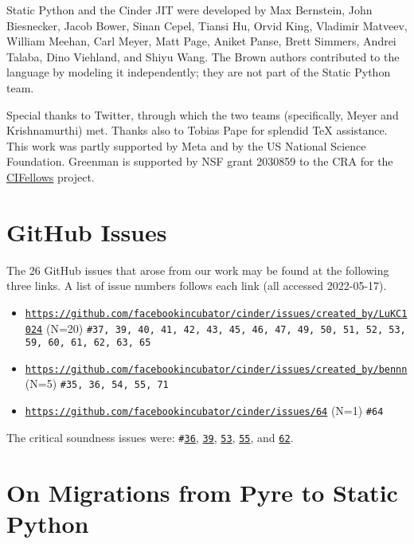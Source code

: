 \documentclass[english,cleveref,crc]{programming}
\newcommand{\shorturl}[2]{\href{#1#2}{\texttt{#1#2}}}
\newcommand{\SP}{Static Python}
\newcommand{\code}[1]{\texttt{#1}}
\begin{document}
\acks
  \SP{} and the Cinder JIT were developed by
  Max Bernstein,
  John Biesnecker,
  Jacob Bower,
  Sinan Cepel,
  Tiansi Hu,
  Orvid King,
  Vladimir Matveev,
  William Meehan,
  Carl Meyer,
  Matt Page,
  Aniket Panse,
  Brett Simmers,
  Andrei Talaba,
  Dino Viehland,
  and Shiyu Wang.
  The Brown authors contributed to the language by modeling it independently; they
  are not part of the \SP{} team.

  Special thanks to Twitter, through which the two teams
  (specifically, Meyer and Krishnamurthi) met.
  Thanks also to Tobias Pape for splendid \TeX{} assistance.
  This work was partly supported by Meta and by the US National Science Foundation.
  Greenman is supported by NSF grant 2030859 to the CRA for the \href{https://cifellows2020.org}{CIFellows} project.

\clearpage
\appendix

\section{GitHub Issues}
\label{a:github-issues}

The 26 GitHub issues that arose from our work may be found at the following three links.
A list of issue numbers follows each link (all accessed 2022-05-17).

\begin{itemize}
  \item \shorturl{https://}{github.com/facebookincubator/cinder/issues/created\_by/LuKC1024} (N=20)
    \subitem \code{\#37, 39, 40, 41, 42, 43, 45, 46, 47, 49, 50, 51, 52, 53, 59, 60, 61, 62, 63, 65}
  \item \shorturl{https://}{github.com/facebookincubator/cinder/issues/created\_by/bennn} (N=5)
    \subitem \code{\#35, 36, 54, 55, 71}
  \item \shorturl{https://}{github.com/facebookincubator/cinder/issues/64} (N=1)
    \subitem \code{\#64}
\end{itemize}

{
  \newcommand{\spsoundness}[1]{\href{https://github.com/facebookincubator/cinder/issues/#1}{\code{#1}}}
\noindent{}The critical soundness issues were:
\code{\#}\spsoundness{36},
         \spsoundness{39},
         \spsoundness{53},
         \spsoundness{55}, and
         \spsoundness{62}.
}

\section{On Migrations from Pyre to \SP{}}
\label{a:pyre-limits}
\end{document}
